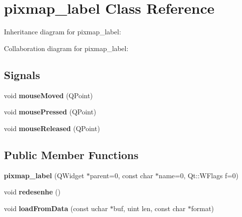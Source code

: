 \hypertarget{classpixmap__label}{}\section{pixmap\+\_\+label Class Reference}
\label{classpixmap__label}


Inheritance diagram for pixmap\+\_\+label\+:


Collaboration diagram for pixmap\+\_\+label\+:
\subsection*{Signals}
\begin{DoxyCompactItemize}
\item 
void {\bfseries mouse\+Moved} (Q\+Point)\hypertarget{classpixmap__label_ac72b428a92ed69013f189dd654cb6316}{}\label{classpixmap__label_ac72b428a92ed69013f189dd654cb6316}

\item 
void {\bfseries mouse\+Pressed} (Q\+Point)\hypertarget{classpixmap__label_af41ef97a1c1b2abff8ab031481c94f4a}{}\label{classpixmap__label_af41ef97a1c1b2abff8ab031481c94f4a}

\item 
void {\bfseries mouse\+Released} (Q\+Point)\hypertarget{classpixmap__label_ace020cc983d936a59f35e02f67b83062}{}\label{classpixmap__label_ace020cc983d936a59f35e02f67b83062}

\end{DoxyCompactItemize}
\subsection*{Public Member Functions}
\begin{DoxyCompactItemize}
\item 
{\bfseries pixmap\+\_\+label} (Q\+Widget $\ast$parent=0, const char $\ast$name=0, Qt\+::\+W\+Flags f=0)\hypertarget{classpixmap__label_a60c235d3740fcf27841fad2ee13682da}{}\label{classpixmap__label_a60c235d3740fcf27841fad2ee13682da}

\item 
void {\bfseries redesenhe} ()\hypertarget{classpixmap__label_a5217575428cde34e63fa0e0e8ac547e0}{}\label{classpixmap__label_a5217575428cde34e63fa0e0e8ac547e0}

\item 
void {\bfseries load\+From\+Data} (const uchar $\ast$buf, uint len, const char $\ast$format)\hypertarget{classpixmap__label_abac9016f9e0ad86d322eb33be3a7d0f0}{}\label{classpixmap__label_abac9016f9e0ad86d322eb33be3a7d0f0}

\end{DoxyCompactItemize}
